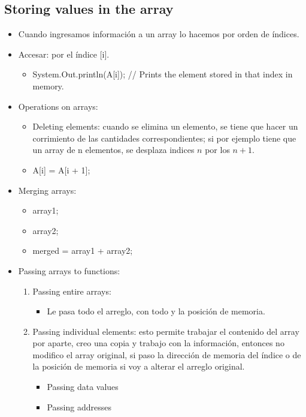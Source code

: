 \subsection{Storing values in the array}
\begin{itemize}
    \item Cuando ingresamos información a un array lo hacemos por orden de índices.
    \item Accesar: por el índice [i].
        \begin{itemize}
            \item System.Out.println(A[i]); // Prints the element stored in that index in memory.
        \end{itemize}
    \item Operations on arrays:
        \begin{itemize}
            \item Deleting elements: cuando se elimina un elemento, se tiene que hacer un corrimiento de las cantidades correspondientes; si por ejemplo tiene que un array de n elementos, se desplaza indices $n$ por los $n + 1$.
            \item A[i] = A[i + 1];
        \end{itemize}
    
    \item Merging arrays:
        \begin{itemize}
            \item array1;
            \item array2; 
            \item merged = array1 + array2; 
        \end{itemize}
    
    \item Passing arrays to functions:
        \begin{enumerate}
            \item Passing entire arrays:
                \begin{itemize}
                    \item Le pasa todo el arreglo, con todo y la posición de memoria.
                \end{itemize}

            \item Passing individual elements: esto permite trabajar el contenido del array por aparte, creo una copia y trabajo con la información, entonces no modifico el array original, si paso la dirección de memoria del índice o de la posición de memoria si voy a alterar el arreglo original.
                \begin{itemize}
                    \item Passing data values 
                    \item Passing addresses 
                \end{itemize}
        \end{enumerate}
\end{itemize}


